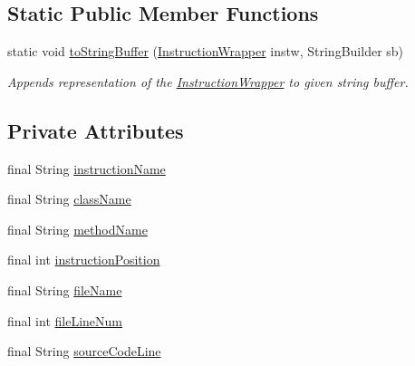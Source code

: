 \subsection*{Static Public Member Functions}
\begin{DoxyCompactItemize}
\item 
static void \hyperlink{classgov_1_1nasa_1_1jpf_1_1inspector_1_1utils_1_1_instruction_wrapper_af07a9c1b7bb51abe7287545737d3e591}{to\+String\+Buffer} (\hyperlink{classgov_1_1nasa_1_1jpf_1_1inspector_1_1utils_1_1_instruction_wrapper}{Instruction\+Wrapper} instw, String\+Builder sb)
\begin{DoxyCompactList}\small\item\em Appends representation of the \hyperlink{classgov_1_1nasa_1_1jpf_1_1inspector_1_1utils_1_1_instruction_wrapper}{Instruction\+Wrapper} to given string buffer. \end{DoxyCompactList}\end{DoxyCompactItemize}
\subsection*{Private Attributes}
\begin{DoxyCompactItemize}
\item 
final String \hyperlink{classgov_1_1nasa_1_1jpf_1_1inspector_1_1utils_1_1_instruction_wrapper_afff7ff26a868cf2a4b77abdb080e028b}{instruction\+Name}
\item 
final String \hyperlink{classgov_1_1nasa_1_1jpf_1_1inspector_1_1utils_1_1_instruction_wrapper_a6838aedba2a378c7fe0df985d8fccb08}{class\+Name}
\item 
final String \hyperlink{classgov_1_1nasa_1_1jpf_1_1inspector_1_1utils_1_1_instruction_wrapper_a84e975c4545e697f843a785af6dd937d}{method\+Name}
\item 
final int \hyperlink{classgov_1_1nasa_1_1jpf_1_1inspector_1_1utils_1_1_instruction_wrapper_a78cea7c9d35c83e0fa1cbbc13022725d}{instruction\+Position}
\item 
final String \hyperlink{classgov_1_1nasa_1_1jpf_1_1inspector_1_1utils_1_1_instruction_wrapper_ac5d8a6508abd8be72ea07f46a553ac71}{file\+Name}
\item 
final int \hyperlink{classgov_1_1nasa_1_1jpf_1_1inspector_1_1utils_1_1_instruction_wrapper_aee26f63a48a9d101ad743eb92f94fe42}{file\+Line\+Num}
\item 
final String \hyperlink{classgov_1_1nasa_1_1jpf_1_1inspector_1_1utils_1_1_instruction_wrapper_a1cef841e53c018c9f385d13c4a32f377}{source\+Code\+Line}
\end{DoxyCompactItemize}

